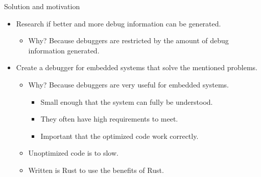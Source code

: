 \begin{frame}{Solution and motivation}
	\begin{itemize}
		\item Research if better and more debug information can be generated.
	    \begin{itemize}
        	\item Why? Because debuggers are restricted by the amount of debug information generated.
	    \end{itemize}
		\item Create a debugger for embedded systems that solve the mentioned problems.
	    \begin{itemize}
        	\item Why? Because debuggers are very useful for embedded systems.
	        \begin{itemize}
            		\item Small enough that the system can fully be understood.
            		\item They often have high requirements to meet.
            		\item Important that the optimized code work correctly.
	        \end{itemize}
        	\item Unoptimized code is to slow.
        	\item Written is Rust to use the benefits of Rust.
	    \end{itemize}
	\end{itemize}
\end{frame}



